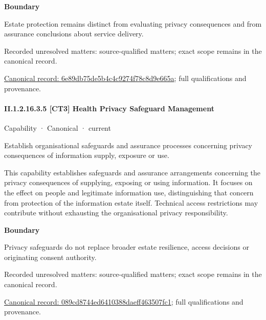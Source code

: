 \textbf{Boundary}



Estate protection remains distinct from evaluating privacy consequences and from assurance conclusions about service delivery.


{\small Recorded unresolved matters: source-qualified matters; exact scope remains in the canonical record.}\par
{\footnotesize \href{../../../../continuum/strategy/capability/6e89db75de5b4c4c9274f78c8d9e665a.md}{Canonical record: 6e89db75de5b4c4c9274f78c8d9e665a}; full qualifications and provenance.}\par
\paragraph*{II.1.2.16.3.5 [CT3] Health Privacy Safeguard Management}
\label{navigation:II.1.2.16.3.5}

\label{element:089cd8744ed6410388daeff463507fc1}
{\small Capability · Canonical · current}\par

Establish organisational safeguards and assurance processes concerning privacy consequences of information supply, exposure or use.



This capability establishes safeguards and assurance arrangements concerning the privacy consequences of supplying, exposing or using information. It focuses on the effect on people and legitimate information use, distinguishing that concern from protection of the information estate itself. Technical access restrictions may contribute without exhausting the organisational privacy responsibility.



\textbf{Boundary}



Privacy safeguards do not replace broader estate resilience, access decisions or originating consent authority.


{\small Recorded unresolved matters: source-qualified matters; exact scope remains in the canonical record.}\par
{\footnotesize \href{../../../../continuum/strategy/capability/089cd8744ed6410388daeff463507fc1.md}{Canonical record: 089cd8744ed6410388daeff463507fc1}; full qualifications and provenance.}\par
